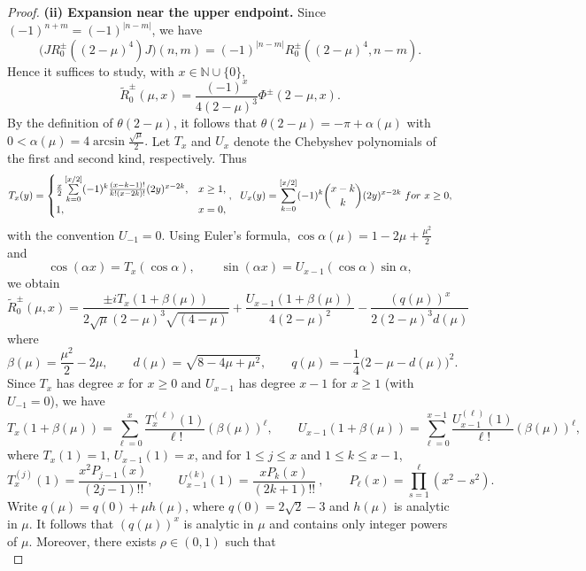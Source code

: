 \documentclass[10pt,a4paper]{amsart}
\newcommand\N{\mathbb{N}}
\numberwithin{equation}{section}
\begin{document}
\begin{proof}
\vskip0.1cm
\textbf{(ii) Expansion near the upper endpoint.}
Since $(-1)^{n+m}=(-1)^{|n-m|}$, we have
\[
\bigl(JR_0^{\pm}((2-\mu)^4)J\bigr)(n,m)
=(-1)^{|n-m|}R_0^{\pm}((2-\mu)^4,n-m).
\]
Hence it suffices to study, with $x\in\N\cup\{0\}$,
\begin{equation*}
\widetilde{R}^{\pm}_0(\mu,x)=\frac{(-1)^x}{4(2-\mu)^3}\Phi^{\pm}(2-\mu,x).
\end{equation*}
By the definition of $\theta(2-\mu)$, it follows that
$\theta(2-\mu)=-\pi+\alpha(\mu)$ with $0<\alpha(\mu)=4\arcsin{\frac{\sqrt{\mu}}{2}}.$
Let $T_x$ and $U_x$ denote the Chebyshev polynomials of the first and second kind, respectively. Thus
\[
T_x(y)=
\begin{cases}
\frac{x}{2}\sum\limits_{k=0}^{[x/2]}(-1)^k
\frac{(x-k-1)!}{k!(x-2k)!}(2y)^{x-2k},&x\geq1,\\
1,&x=0,
\end{cases},\ \ 
U_x(y)=\sum_{k=0}^{[x/2]}(-1)^k
\binom{x-k}{k}(2y)^{x-2k}\ {\rm for}\  x\geq0,
\]
with the convention $U_{-1}=0$.
Using Euler's formula, $\cos\alpha(\mu)=1-2\mu+\frac{\mu^2}{2}$ and 
$$\cos (\alpha x)=T_x(\cos \alpha),\qquad \sin (\alpha x)= U_{x-1}(\cos\alpha)\sin \alpha,$$
we obtain
\begin{equation}\label{eq:upper-cheb}
\widetilde{R}^{\pm}_0(\mu,x)=\frac{\pm iT_x(1+\beta(\mu))}{2\sqrt{\mu}(2-\mu)^3\sqrt{(4-\mu)}}+\frac{U_{x-1}(1+\beta(\mu))}{4(2-\mu)^2}-\frac{(q(\mu))^x}{2(2-\mu)^3d(\mu)}
\end{equation}
where
$$\beta(\mu)=\frac{\mu^2}{2}-2\mu,\qquad d(\mu)=\sqrt{8-4\mu+\mu^2},\qquad q(\mu)=-\frac{1}{4}\big(2-\mu-d(\mu)\big)^2.$$
Since $T_x$ has degree $x$ for $x\geq0$ and $U_{x-1}$ has degree $x-1$ for $x\geq1$ (with $U_{-1}=0$), we have
\[
T_x(1+\beta(\mu))
=\sum_{\ell=0}^{x}\frac{T_x^{(\ell)}(1)}{\ell!}(\beta(\mu))^\ell
,\qquad
U_{x-1}(1+\beta(\mu))
=\sum_{\ell=0}^{x-1}\frac{U_{x-1}^{(\ell)}(1)}{\ell!}(\beta(\mu))^\ell,
\]
where $T_x(1)=1$, $U_{x-1}(1)=x$, and for $1\leq j\leq x $ and $1\leq k\leq x-1$,
\begin{equation}\label{Tx1 Ux1}
T_x^{(j)}(1)=
    \frac{x^2 P_{j-1}(x)}
{(2j-1)!!}
,\qquad U_{x-1}^{(k)}(1)=
    \frac{xP_{k}(x)}
{(2k+1)!!}~
,\qquad P_{\ell}(x)=\displaystyle\prod_{s=1}^{\ell}(x^2-s^2).
\end{equation}
Write $q(\mu)=q(0)+\mu h(\mu)$, where $q(0)=2\sqrt{2}-3$ and  $h(\mu)$ is analytic in $\mu$. It follows that $(q(\mu))^x$ is analytic in $\mu$ and contains only integer powers
of $\mu$. Moreover, there exists $\rho\in(0,1)$ such that
\begin{equation}\label{qu}

\end{equation}
\end{proof}
\end{document}
